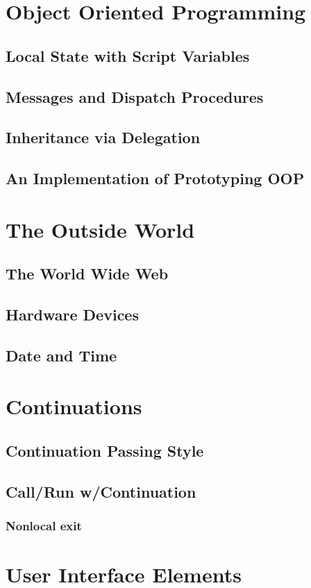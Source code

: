 \documentclass{report}
\begin{document}
\chapter{Object Oriented Programming}
\section{Local State with Script Variables}
\section{Messages and Dispatch Procedures}
\section{Inheritance via Delegation}
\section{An Implementation of Prototyping OOP}
\chapter{The Outside World}
\section{The World Wide Web}
\section{Hardware Devices}
\section{Date and Time}
\chapter{Continuations}
\section{Continuation Passing Style}
\section{Call/Run w/Continuation}
\subsection{Nonlocal exit}
\chapter{User Interface Elements}
\end{document}
